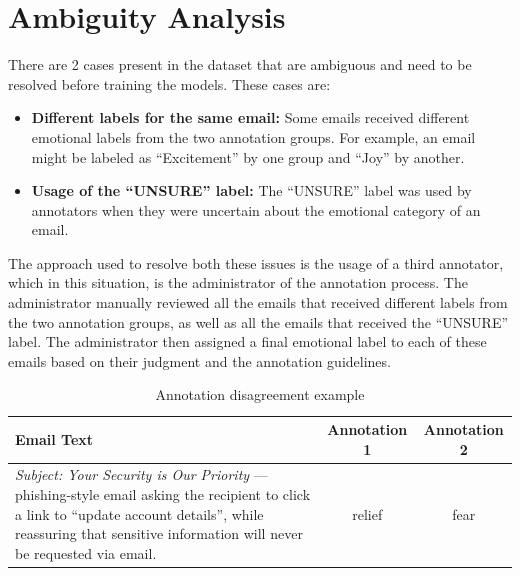 \section{Ambiguity Analysis}
There are 2 cases present in the dataset that are ambiguous and need to be resolved before training the models. These cases are:
\begin{itemize}
    \item \textbf{Different labels for the same email:} Some emails received different emotional labels from the two annotation groups. For example, an email might be labeled as ``Excitement'' by one group and ``Joy'' by another. 
    \item \textbf{Usage of the ``UNSURE'' label:} The ``UNSURE'' label was used by annotators when they were uncertain about the emotional category of an email.
\end{itemize}

The approach used to resolve both these issues is the usage of a third annotator, which in this situation, is the administrator of the annotation process. The administrator manually reviewed all the emails that received different labels from the two annotation groups, as well as all the emails that received the ``UNSURE'' label. The administrator then assigned a final emotional label to each of these emails based on their judgment and the annotation guidelines.

\begin{table}[htbp]
\centering
\small
\caption{Annotation disagreement example}
\label{tab:annotation_disagreement}
\begin{tabular}{p{10cm}cc}
\hline
\textbf{Email Text} & \textbf{Annotation 1} & \textbf{Annotation 2} \\
\hline
\textit{Subject: Your Security is Our Priority} --- phishing-style email asking the recipient to click a link to ``update account details'', while reassuring that sensitive information will never be requested via email. & relief & fear \\
\hline
\end{tabular}
\end{table}